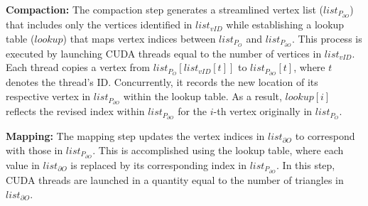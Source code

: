 

\textbf{Compaction:}
The compaction step generates a streamlined vertex list ($list_{P_{\partial O}}$) that includes only the vertices identified in $list_{vID}$ while establishing a lookup table ($lookup$) that maps vertex indices between $list_{P_O}$ and $list_{P_{\partial O}}$.
This process is executed by launching CUDA threads equal to the number of vertices in $list_{vID}$.
Each thread copies a vertex from $list_{P_O}[list_{vID}[t]]$ to $list_{P_{\partial O}}[t]$, where $t$ denotes the thread's ID.
Concurrently, it records the new location of its respective vertex in $list_{P_{\partial O}}$ within the lookup table.
As a result, $lookup[i]$ reflects the revised index within $list_{P_{\partial O}}$ for the $i$-th vertex originally in $list_{P_O}$.


\textbf{Mapping:}
The mapping step updates the vertex indices in $list_{\partial O}$ to correspond with those in $list_{P_{\partial O}}$.
This is accomplished using the lookup table, where each value in $list_{\partial O}$ is replaced by its corresponding index in $list_{P_{\partial O}}$.
In this step, CUDA threads are launched in a quantity equal to the number of triangles in $list_{\partial O}$.

